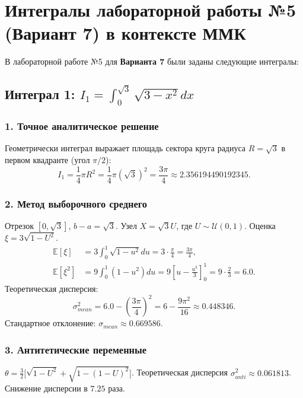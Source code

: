 \documentclass[11pt,a4paper]{article}
\begin{document}
\newpage

\section{Интегралы лабораторной работы №5 (Вариант 7) в контексте ММК}

В лабораторной работе №5 для \textbf{Варианта 7} были заданы следующие интегралы:

\subsection{Интеграл 1: $I_1 = \int_0^{\sqrt{3}} \sqrt{3 - x^2} dx$}

\subsubsection{1. Точное аналитическое решение}
Геометрически интеграл выражает площадь сектора круга радиуса $R = \sqrt{3}$ в первом квадранте (угол $\pi/2$):
\begin{equation}
    I_1 = \frac{1}{4} \pi R^2 = \frac{1}{4} \pi (\sqrt{3})^2 = \frac{3\pi}{4} \approx 2.356194490192345.
\end{equation}

\subsubsection{2. Метод выборочного среднего}
Отрезок $[0, \sqrt{3}]$, $b - a = \sqrt{3}$. Узел $X = \sqrt{3}U$, где $U \sim \mathcal{U}(0,1)$. Оценка $\xi = 3\sqrt{1 - U^2}$.
\begin{align}
    \mathbb{E}[\xi] &= 3 \int_0^1 \sqrt{1 - u^2} du = 3 \cdot \frac{\pi}{4} = \frac{3\pi}{4}, \\
    \mathbb{E}[\xi^2] &= 9 \int_0^1 (1 - u^2) du = 9 \left[ u - \frac{u^3}{3} \right]_0^1 = 9 \cdot \frac{2}{3} = 6.0.
\end{align}
Теоретическая дисперсия:
\begin{equation}
    \sigma^2_{mean} = 6.0 - \left(\frac{3\pi}{4}\right)^2 = 6 - \frac{9\pi^2}{16} \approx 0.448346.
\end{equation}
Стандартное отклонение: $\sigma_{mean} \approx 0.669586$.

\subsubsection{3. Антитетические переменные}
$\theta = \frac{3}{2}\big[\sqrt{1 - U^2} + \sqrt{1 - (1 - U)^2}\big]$.
Теоретическая дисперсия $\sigma^2_{anti} \approx 0.061813$. Снижение дисперсии в $7.25$ раза.
\end{document}
